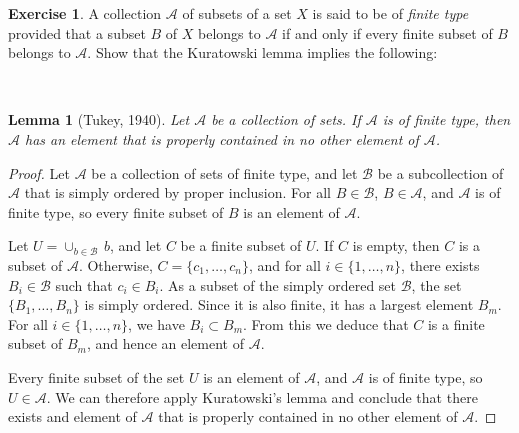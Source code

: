 \documentclass[11pt,a4paper,twoside]{article}
\theoremstyle{definition}
\newcounter{excounter}
\newtheorem{exercise}[excounter]{Exercise}
\theoremstyle{plain}
\newtheorem*{lemma}{Lemma}
\begin{document}
\begin{exercise}

  A collection $\mathscr{A}$ of subsets of a set $X$ is said to be of \emph{finite type}
  provided that a subset $B$ of $X$ belongs to $\mathscr{A}$ if and only if every finite
  subset of $B$ belongs to $\mathscr{A}$.
  Show that the Kuratowski lemma implies the following:

\end{exercise}

~\\
\begin{lemma}[Tukey, 1940]
  Let $\mathscr{A}$ be a collection of sets. If $\mathscr{A}$ is of finite type, then
  $\mathscr{A}$ has an element that is properly contained in no other element of $\mathscr{A}$.
\end{lemma}

\begin{proof}

  Let $\mathscr{A}$ be a collection of sets of finite type, and let $\mathscr{B}$ be
  a subcollection of $\mathscr{A}$ that is simply ordered by proper inclusion.
  For all $B \in \mathscr{B}$, $B \in \mathscr{A}$, and $\mathscr{A}$ is of finite type,
  so every finite subset of $B$ is an element of $\mathscr{A}$.

  Let $U = \cup_{b \in \mathscr{B}} \,b$, and let $C$ be a finite subset of $U$.
  If $C$ is empty, then $C$ is a subset of $\mathscr{A}$. Otherwise, $C = \{ c_1, \dotsc, c_n \}$,
  and for all $i \in \{ 1, \dotsc, n \}$, there exists $B_i \in \mathscr{B}$ such that $c_i \in B_i$.
  As a subset of the simply ordered set $\mathscr{B}$, the set $\{ B_1, \dotsc, B_n \}$ is simply ordered.
  Since it is also finite, it has a largest element $B_m$. For all $i \in \{ 1, \dotsc, n \}$,
  we have $B_i \subset B_m$. From this we deduce that $C$ is a finite subset of $B_m$,
  and hence an element of $\mathscr{A}$.

  Every finite subset of the set $U$ is an element of $\mathscr{A}$, and $\mathscr{A}$ is of finite type,
  so $U \in \mathscr{A}$. We can therefore apply Kuratowski's lemma and conclude that there exists
  and element of $\mathscr{A}$ that is properly contained in no other element of $\mathscr{A}$.

\end{proof}
\end{document}
